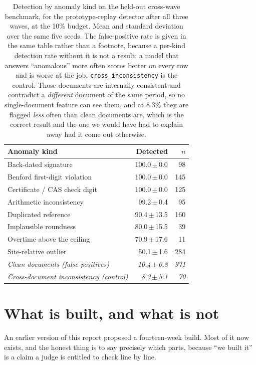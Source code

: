 \documentclass[11pt,a4paper]{article}
\begin{document}
\begin{table}[htbp]
\centering
\caption{Detection by anomaly kind on the held-out cross-wave benchmark, for the
prototype-replay detector after all three waves, at the 10\% budget. Mean and
standard deviation over the same five seeds. The false-positive rate is given in
the same table rather than a footnote, because a per-kind detection rate without
it is not a result: a model that answers ``anomalous'' more often scores better
on every row and is worse at the job. \texttt{cross\_inconsistency} is the
control. Those documents are internally consistent and contradict a
\emph{different} document of the same period, so no single-document feature can
see them, and at 8.3\% they are flagged \emph{less} often than clean documents
are, which is the correct result and the one we would have had to explain away
had it come out otherwise.}
\label{tab:corpus_kinds}
\small
\begin{tabular}{@{}l r r@{}}
\toprule
\textbf{Anomaly kind} & \textbf{Detected} & \textbf{$n$} \\
\midrule
Back-dated signature          & 100.0\,$\pm$\,0.0 &  98 \\
Benford first-digit violation & 100.0\,$\pm$\,0.0 & 145 \\
Certificate / CAS check digit & 100.0\,$\pm$\,0.0 & 125 \\
Arithmetic inconsistency      &  99.2\,$\pm$\,0.4 &  95 \\
Duplicated reference          &  90.4\,$\pm$\,13.5 & 160 \\
Implausible roundness         &  80.0\,$\pm$\,15.5 &  39 \\
Overtime above the ceiling    &  70.9\,$\pm$\,17.6 &  11 \\
Site-relative outlier         &  50.1\,$\pm$\,1.6 & 284 \\
\midrule
\textit{Clean documents (false positives)} & \textit{10.4\,$\pm$\,0.8} & \textit{971} \\
\textit{Cross-document inconsistency (control)} & \textit{8.3\,$\pm$\,5.1} & \textit{70} \\
\bottomrule
\end{tabular}
\end{table}


\section{What is built, and what is not}
\label{sec:proto}

An earlier version of this report proposed a fourteen-week build. Most of it now
exists, and the honest thing is to say precisely which parts, because ``we built
it'' is a claim a judge is entitled to check line by line.
\end{document}
